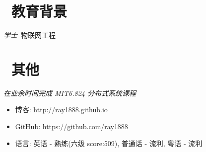 \documentclass{resume}
\begin{document}
\section{\faGraduationCap\  教育背景}
\textit{学士}\ 物联网工程

\section{\faInfo\ 其他}
\textit{在业余时间完成 MIT6.824 分布式系统课程}
\begin{itemize}[parsep=0.5ex]
    \item 博客: http://ray1888.github.io 
    \item GitHub: https://github.com/ray1888
    \item 语言: 英语 - 熟练(六级 score:509), 普通话 - 流利, 粤语 - 流利
\end{itemize}

%
%
\end{document}
